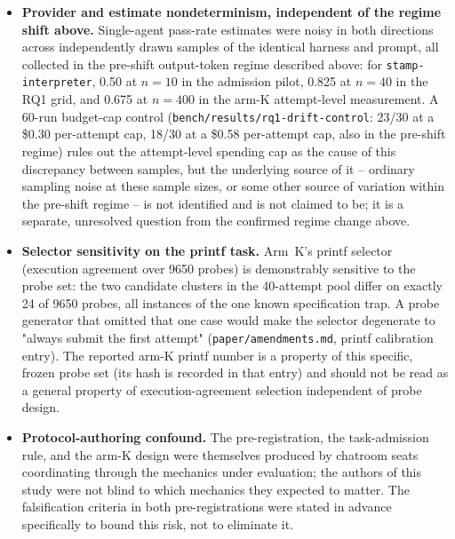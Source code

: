 \begin{itemize}
\item \textbf{Provider and estimate nondeterminism, independent of the regime shift above.}
  Single-agent pass-rate estimates were noisy in both directions across independently drawn samples of
  the identical harness and prompt, all collected in the pre-shift output-token regime described above:
  for \texttt{stamp-interpreter}, 0.50 at $n=10$ in the admission pilot, 0.825 at $n=40$ in the RQ1 grid,
  and 0.675 at $n=400$ in the arm-K attempt-level measurement. A 60-run budget-cap control
  (\texttt{bench/results/rq1-drift-control}: 23/30 at a \$0.30 per-attempt cap, 18/30 at a \$0.58
  per-attempt cap, also in the pre-shift regime) rules out the attempt-level spending cap as the cause of
  this discrepancy between samples, but the underlying source of it -- ordinary sampling noise at these
  sample sizes, or some other source of variation within the pre-shift regime -- is not identified and is
  not claimed to be; it is a separate, unresolved question from the confirmed regime change above.

\item \textbf{Selector sensitivity on the printf task.} Arm~K's printf selector (execution agreement
  over 9650 probes) is demonstrably sensitive to the probe set: the two candidate clusters in the
  40-attempt pool differ on exactly 24 of 9650 probes, all instances of the one known specification
  trap. A probe generator that omitted that one case would make the selector degenerate to "always
  submit the first attempt" (\texttt{paper/amendments.md}, printf calibration entry). The reported
  arm-K printf number is a property of this specific, frozen probe set (its hash is recorded in that
  entry) and should not be read as a general property of execution-agreement selection independent of
  probe design.

\item \textbf{Protocol-authoring confound.} The pre-registration, the task-admission rule, and the
  arm-K design were themselves produced by chatroom seats coordinating through the mechanics under
  evaluation; the authors of this study were not blind to which mechanics they expected to matter. The
  falsification criteria in both pre-registrations were stated in advance specifically to bound this
  risk, not to eliminate it.


\end{itemize}

